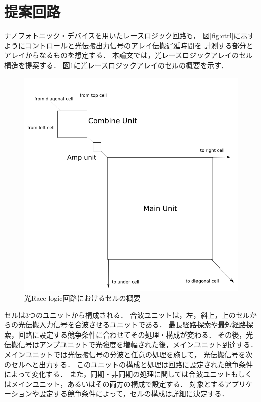 \section{提案回路}
ナノフォトニック・デバイスを用いたレースロジック回路も，
図\ref{fig:ctrl}に示すようにコントロールと光伝搬出力信号のアレイ伝搬遅延時間を
計測する部分とアレイからなるものを想定する．
本論文では，光レースロジックアレイのセル構造を提案する．
図\ref{fig:lightracelogiccell}に光レースロジックアレイのセルの概要を示す．
\begin{figure}[t!]
\begin{center}
\includegraphics[keepaspectratio,scale=0.5]{fig/3/lightracelogic_cell_1.png}
\caption{光Race logic回路におけるセルの概要}
\label{fig:lightracelogiccell}
\end{center}
\end{figure}

セルは3つのユニットから構成される．
合波ユニットは，左，斜上，上のセルからの光伝搬入力信号を合波させるユニットである．
最長経路探索や最短経路探索，回路に設定する競争条件に合わせてその処理・構成が変わる．
その後，光伝搬信号はアンプユニットで光強度を増幅された後，メインユニット到達する．
メインユニットでは光伝搬信号の分波と任意の処理を施して，
光伝搬信号を次のセルへと出力する．
このユニットの構成と処理は回路に設定された競争条件によって変化する．
また，同期・非同期の処理に関しては合波ユニットもしくはメインユニット，あるいはその両方の構成で設定する．
対象とするアプリケーションや設定する競争条件によって，セルの構成は詳細に決定する．

